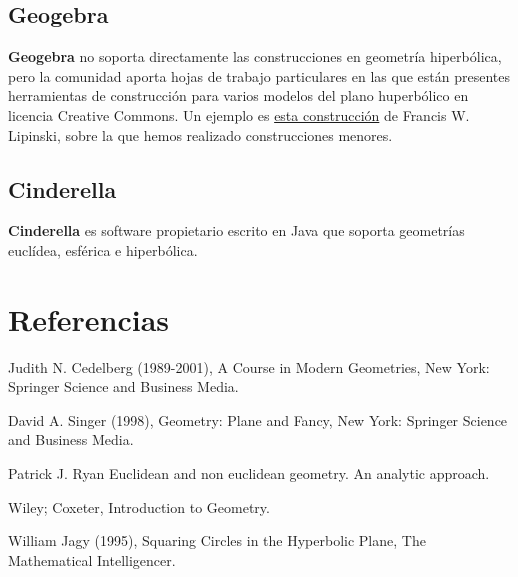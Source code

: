 \documentclass{article}
\theoremstyle{plain}
\theoremstyle{definition}
\theoremstyle{remark}
\begin{document}
\subsection{Geogebra}
\textbf{Geogebra} no soporta directamente las construcciones en geometría
hiperbólica, pero la comunidad aporta hojas de trabajo particulares en las
que están presentes herramientas de construcción para varios modelos del
plano huperbólico en licencia Creative Commons. Un ejemplo es
\href{https://www.geogebra.org/material/show/id/2028857}{esta construcción}
de Francis W. Lipinski, sobre la que hemos realizado construcciones menores.

\subsection{Cinderella}
\textbf{Cinderella} es software propietario escrito en Java que soporta geometrías
euclídea, esférica e hiperbólica.

\section{Referencias}
\begin{thebibliography}{9}

  Judith N. Cedelberg (1989-2001),
  A Course in Modern Geometries,
  New York: Springer Science and Business Media.

  David A. Singer (1998),
  Geometry: Plane and Fancy,
  New York: Springer Science and Business Media.

  Patrick J. Ryan
  Euclidean and non euclidean geometry. An analytic approach.

  Wiley; Coxeter,
  Introduction to Geometry.

  William Jagy (1995),
  Squaring Circles in the Hyperbolic Plane,
  The Mathematical Intelligencer.
  
\end{thebibliography}
\end{document}
